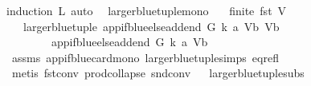 \begin{isabellebody}
%
\isadelimproof
%
\endisadelimproof
%
\isatagproof
{}\isamarkupfalse%
{\isacharparenleft}{\kern0pt}induction\ L{\isacharcomma}{\kern0pt}\ auto{\isacharparenright}{\kern0pt}\ \isamarkupfalse%
%
\endisatagproof
{\isafoldproof}%
%
\isadelimproof
%
\endisadelimproof
%
\isadelimdocument
%
\endisadelimdocument
%
\isatagdocument
%
\isamarkuptrue%
%
\endisatagdocument
{\isafolddocument}%
%
\isadelimdocument
%
\endisadelimdocument
{}\isamarkupfalse%
\ larger{\isacharunderscore}{\kern0pt}blue{\isacharunderscore}{\kern0pt}tuple{\isacharunderscore}{\kern0pt}mono{\isacharcolon}{\kern0pt}\isanewline
\ \ \ {\isachardoublequoteopen}finite\ {\isacharparenleft}{\kern0pt}fst\ V{\isacharparenright}{\kern0pt}{\isachardoublequoteclose}\isanewline
\ \ \ {\isachardoublequoteopen}larger{\isacharunderscore}{\kern0pt}blue{\isacharunderscore}{\kern0pt}tuple\ {\isacharparenleft}{\kern0pt}{\isacharparenleft}{\kern0pt}app{\isacharunderscore}{\kern0pt}if{\isacharunderscore}{\kern0pt}blue{\isacharunderscore}{\kern0pt}else{\isacharunderscore}{\kern0pt}add{\isacharunderscore}{\kern0pt}end\ G\ k\ a\ V{\isacharparenright}{\kern0pt}{\isacharcomma}{\kern0pt}b{\isacharparenright}{\kern0pt}\ {\isacharparenleft}{\kern0pt}V{\isacharcomma}{\kern0pt}b{\isacharparenright}{\kern0pt}\isanewline
\ \ \ \ \ \ \ {\isacharequal}{\kern0pt}\ {\isacharparenleft}{\kern0pt}{\isacharparenleft}{\kern0pt}app{\isacharunderscore}{\kern0pt}if{\isacharunderscore}{\kern0pt}blue{\isacharunderscore}{\kern0pt}else{\isacharunderscore}{\kern0pt}add{\isacharunderscore}{\kern0pt}end\ G\ k\ a\ V{\isacharparenright}{\kern0pt}{\isacharcomma}{\kern0pt}b{\isacharparenright}{\kern0pt}{\isachardoublequoteclose}\ \isanewline
%
\isadelimproof
\ \ %
\endisadelimproof
%
\isatagproof
{}\isamarkupfalse%
\ assms\ app{\isacharunderscore}{\kern0pt}if{\isacharunderscore}{\kern0pt}blue{\isacharunderscore}{\kern0pt}card{\isacharunderscore}{\kern0pt}mono\ larger{\isacharunderscore}{\kern0pt}blue{\isacharunderscore}{\kern0pt}tuple{\isachardot}{\kern0pt}simps\ eq{\isacharunderscore}{\kern0pt}refl\isanewline
\ \ \isamarkupfalse%
\ {\isacharparenleft}{\kern0pt}metis\ fst{\isacharunderscore}{\kern0pt}conv\ prod{\isachardot}{\kern0pt}collapse\ snd{\isacharunderscore}{\kern0pt}conv{\isacharparenright}{\kern0pt}%
\endisatagproof
{\isafoldproof}%
%
\isadelimproof
\ \isanewline
%
\endisadelimproof
\isanewline
\isanewline
{}\isamarkupfalse%
\ larger{\isacharunderscore}{\kern0pt}blue{\isacharunderscore}{\kern0pt}tuple{\isacharunderscore}{\kern0pt}subs{\isacharcolon}{\kern0pt}\isanewline

\end{isabellebody}
